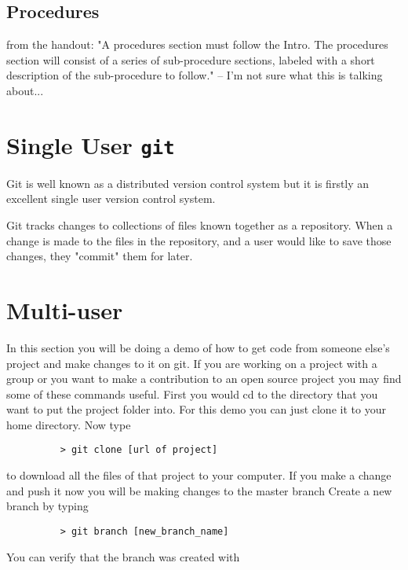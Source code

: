 \documentclass[11pt]{report}
\begin{document}
\section{Procedures}
from the handout: "A procedures section must follow the Intro. The
procedures section will consist of a series of sub-procedure sections,
labeled with a short description of the sub-procedure to follow." --
I'm not sure what this is talking about...

\chapter{Single User \texttt{git}}
Git is well known as a distributed version control system but it is
firstly an excellent single user version control system.

Git tracks changes to collections of files known together as a repository.
When a change is made to the files in the repository, and a user would like
to save those changes, they "commit" them for later.


\chapter{Multi-user}
In this section you will be doing a demo of how to get code from
someone else's project and make changes to it on git. If you are
working on a project with a group or you want to make a contribution
to an open source project you may find some of these commands useful.
First you would cd to the directory that you want to put the project
folder into.  For this demo you can just clone it to your home
directory.  Now type
\begin{figure}[H]
  \begin{lstlisting}
    > git clone [url of project]
  \end{lstlisting}
\end{figure}


to download all the files of that project to your computer.  If you
make a change and push it now you will be making changes to the master
branch Create a new branch by typing

\begin{figure}[H]
  \begin{lstlisting}
    > git branch [new_branch_name]
  \end{lstlisting}
\end{figure}

You can verify that the branch was created with
\end{document}
